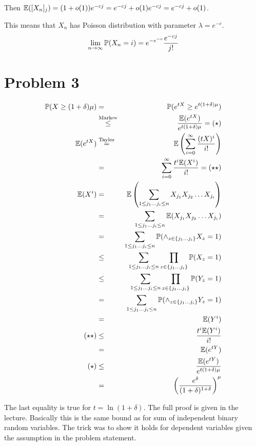 \documentclass[a4paper]{article}
\begin{document}
Then $ \E([X_n]_j) = (1 + o(1))e^{-cj} = e^{-cj} + o(1)e^{-cj} = e^{-cj} + o(1) $.

This means that $ X_n $ has Poisson distribution with parameter $ \lambda = e^{-c} $. 
$$
  \lim_{n\to \infty} \P(X_n = i) = e^{-e^{-c}} \frac{e^{-cj}}{j!}
$$

\section*{Problem 3}

\begin{eqnarray*}
\P(X \ge (1 + \delta)\mu)
  &=& \P(e^{tX} \ge e^{t(1 + \delta)\mu}) \\
  &\overset{\mathrm{Markov}}{\le}& \frac{\E(e^{tX})}{e^{t(1 + \delta)\mu}} = (\star) \\
\E(e^{tX})
  &\overset{\mathrm{Taylor}}{=}& \E\B{\sum_{i=0}^{\infty} \frac{(tX)^i}{i!}} \\
  &=& \sum_{i=0}^{\infty} \frac{t^i \E(X^i)}{i!} = (\star\star) \\
\E(X^i)
  &=& \E\B{\sum_{1 \le j_1\dots j_i \le n} X_{j_1}X_{j_2}\dots X_{j_i}} \\
  &=& \sum_{1 \le j_1\dots j_i \le n} \E(X_{j_1}X_{j_2}\dots X_{j_i}) \\
  &=& \sum_{1 \le j_1\dots j_i \le n} \P(\land_{z \in \{ j_1 \dots j_i \}} X_{z} = 1) \\
  &\le& \sum_{1 \le j_1\dots j_i \le n} \prod_{z \in \{ j_1 \dots j_i \}} \P( X_{z} = 1) \\
  &\le& \sum_{1 \le j_1\dots j_i \le n} \prod_{z \in \{ j_1 \dots j_i \}} \P( Y_{z} = 1) \\
  &=& \sum_{1 \le j_1\dots j_i \le n} \P(\land_{z \in \{ j_1 \dots j_i \}} Y_{z} = 1) \\
  &=& \E(Y^i) \\
(\star\star)
  &\le& \frac{t^i \E(Y^i)}{i!} \\
  &=& \E(e^{tY}) \\
(\star)
  &\le& \frac{\E(e^{tY})}{e^{t(1 + \delta)\mu}} \\
  &=& \B{\frac{e^\delta}{(1+\delta)^{1+\delta}}}^\mu
\end{eqnarray*}

The last equality is true for $ t = \ln (1 + \delta) $. The full proof is given
in the lecture. Basically this is the same bound as for sum of independent
binary random variables. The trick was to show it holds for dependent variables
given the assumption in the problem statement.
\end{document}
